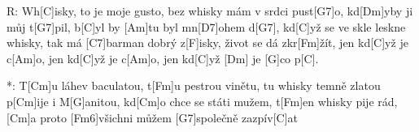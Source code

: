 
R: Wh[C]isky, to je moje gusto,
bez whisky mám v srdci pust[G7]o,
kd[Dm]yby ji můj t[G7] pil,
b[C]yl by [Am]tu byl mn[D7]ohem d[G7],
kd[C]yž se ve skle leskne whisky,
tak má [C7]barman dobrý z[F]isky,
život se dá zkr[Fm] žít,
jen kd[C]yž je c[Am]o, jen kd[C]yž je c[Am]o,
jen kd[C]yž [Dm] je [G]co p[C].

*: T[Cm]u láhev baculatou, t[Fm]u pestrou vinětu,
tu whisky temně zlatou p[Cm]ije i M[G]anitou,
kd[Cm]o chce se státi mužem, t[Fm]en whisky pije rád,
[Cm]a proto [Fm6]všichni můžem [G7]společně zazpív[C]at
